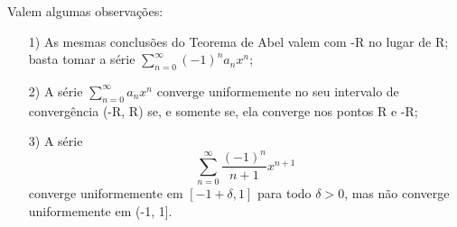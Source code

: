 \documentclass[../analysis_notes.tex]{subfiles}
\begin{document}
Valem algumas observações:
\begin{itemize}
	\item[1)] As mesmas conclusões do Teorema de Abel valem com -R no lugar de R; basta tomar a série \(\sum\limits_{n=0}^{\infty}(-1)^{n}a_{n}x^{n}\);
	\item[2)] A série \(\sum\limits_{n=0}^{\infty}a_{n}x^{n}\) converge uniformemente no seu intervalo de convergência (-R, R) se, e somente se, ela converge nos pontos R e -R;
	\item[3)] A série
	      \[
		      \sum\limits_{n=0}^{\infty}\frac{(-1)^{n}}{n+1}x^{n+1}
	      \]
	      converge uniformemente em \([-1+\delta , 1]\) para todo \(\delta > 0\), mas não converge uniformemente em (-1, 1].
\end{itemize}
\end{document}
